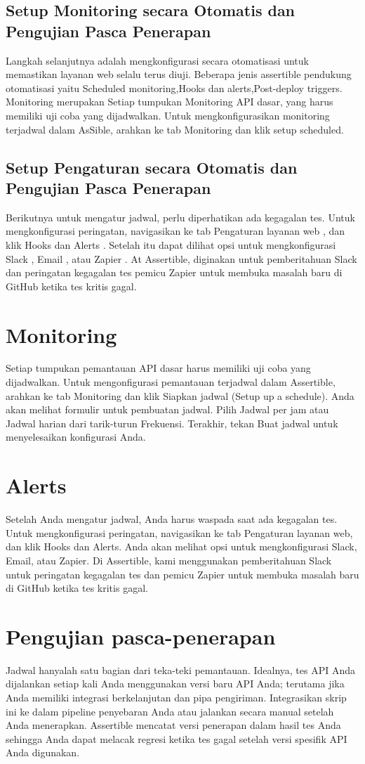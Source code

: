 \subsection{Setup Monitoring secara Otomatis dan Pengujian Pasca Penerapan}
Langkah selanjutnya adalah mengkonfigurasi secara otomatisasi untuk memastikan layanan web selalu terus diuji. 
Beberapa jenis assertible pendukung otomatisasi yaitu Scheduled monitoring,Hooks dan alerts,Post-deploy triggers. Monitoring merupakan
Setiap tumpukan Monitoring API dasar, yang harus memiliki uji coba yang dijadwalkan. Untuk mengkonfigurasikan monitoring terjadwal dalam AsSible, arahkan ke tab Monitoring dan klik setup scheduled.

\subsection{Setup Pengaturan secara Otomatis dan Pengujian Pasca Penerapan}
Berikutnya untuk mengatur jadwal, perlu diperhatikan ada kegagalan tes. Untuk mengkonfigurasi peringatan, navigasikan ke tab Pengaturan layanan web , dan klik Hooks dan Alerts . Setelah itu dapat dilihat opsi untuk mengkonfigurasi Slack , Email , atau Zapier . At Assertible, diginakan untuk pemberitahuan Slack dan peringatan kegagalan tes pemicu Zapier untuk membuka masalah baru di GitHub ketika tes kritis gagal. 

\section{Monitoring}
Setiap tumpukan pemantauan API dasar harus memiliki uji coba yang dijadwalkan. Untuk mengonfigurasi pemantauan terjadwal dalam Assertible, arahkan ke tab Monitoring dan klik Siapkan jadwal (Setup up a schedule).  Anda akan melihat formulir untuk pembuatan jadwal. Pilih Jadwal per jam atau Jadwal harian dari tarik-turun Frekuensi. Terakhir, tekan Buat jadwal untuk menyelesaikan konfigurasi Anda.

\section{Alerts}
Setelah Anda mengatur jadwal, Anda harus waspada saat ada kegagalan tes. Untuk mengkonfigurasi peringatan, navigasikan ke tab Pengaturan layanan web, dan klik Hooks dan Alerts. Anda akan melihat opsi untuk mengkonfigurasi Slack, Email, atau Zapier.
Di Assertible, kami menggunakan pemberitahuan Slack untuk peringatan kegagalan tes dan pemicu Zapier untuk membuka masalah baru di GitHub ketika tes kritis gagal. 

\section{Pengujian pasca-penerapan}
Jadwal hanyalah satu bagian dari teka-teki pemantauan. Idealnya, tes API Anda dijalankan setiap kali Anda menggunakan versi baru API Anda; terutama jika Anda memiliki integrasi berkelanjutan dan pipa pengiriman. Integrasikan skrip ini ke dalam pipeline penyebaran Anda atau jalankan secara manual setelah Anda menerapkan. Assertible mencatat versi penerapan dalam hasil tes Anda sehingga Anda dapat melacak regresi ketika tes gagal setelah versi spesifik API Anda digunakan.